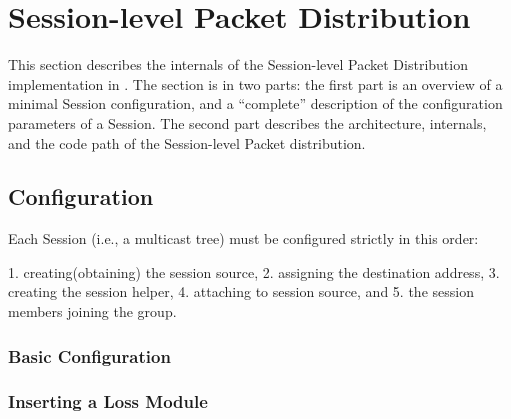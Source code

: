 \chapter{Session-level Packet Distribution}
\label{chap:session}

This section describes the internals of the Session-level Packet Distribution
implementation in \ns.
The section is in two parts:
the first part is an overview of 
a minimal Session configuration,
and a ``complete'' description of the configuration parameters 
of a Session.
The second part describes the architecture, internals, and the code path
of the Session-level Packet distribution.

\section{Configuration}
\label{sec:session-config}

Each Session (i.e., a multicast tree) must be configured strictly in
this order:
 
1. creating(obtaining) the session source,
2. assigning the destination address,
3. creating the session helper, 
4. attaching to session source, and
5. the session members joining the group.


\subsection{Basic Configuration}
\label{sec:basic-config}

\subsection{Inserting a Loss Module}
\label{sec:loss-config}
